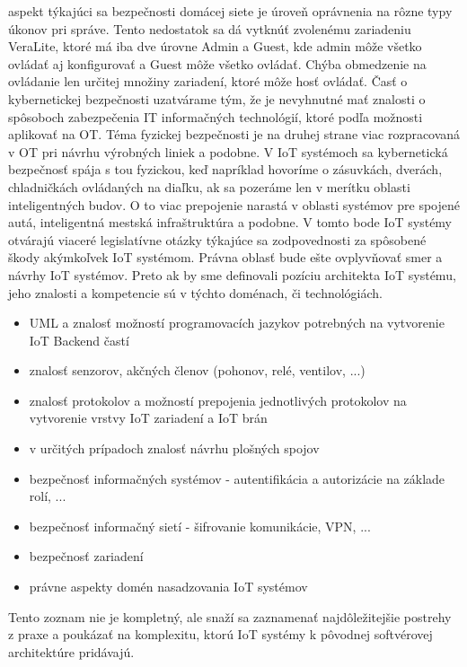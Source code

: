 aspekt týkajúci sa bezpečnosti domácej siete je úroveň oprávnenia na rôzne typy úkonov pri správe. Tento nedostatok sa dá vytknúť zvolenému zariadeniu VeraLite, ktoré má iba dve úrovne Admin a Guest, kde admin môže všetko ovládať aj konfigurovať a Guest môže všetko ovládať. Chýba obmedzenie na ovládanie len určitej množiny zariadení, ktoré môže hosť ovládať. Časť o kybernetickej bezpečnosti uzatvárame tým, že je nevyhnutné mať znalosti o spôsoboch zabezpečenia IT informačných technológií, ktoré podľa možnosti aplikovať na OT. Téma fyzickej bezpečnosti je na druhej strane viac rozpracovaná v OT pri návrhu výrobných liniek a podobne. V IoT systémoch sa kybernetická bezpečnosť spája s tou fyzickou, keď napríklad hovoríme o zásuvkách, dverách, chladničkách ovládaných na diaľku, ak sa pozeráme len v merítku oblasti inteligentných budov. O to viac prepojenie narastá v oblasti systémov pre spojené autá, inteligentná mestská infraštruktúra a podobne. V tomto bode IoT systémy otvárajú viaceré legislatívne otázky týkajúce sa zodpovednosti za spôsobené škody akýmkoľvek IoT systémom. Právna oblasť bude ešte ovplyvňovať smer a návrhy IoT systémov.   
Preto ak by sme definovali pozíciu architekta IoT systému, jeho znalosti a kompetencie sú v týchto doménach, či technológiách.
\begin{itemize}
\item UML a znalosť možností programovacích jazykov potrebných na vytvorenie IoT Backend častí
\item znalosť senzorov, akčných členov (pohonov, relé, ventilov, ...)
\item znalosť protokolov a možností prepojenia jednotlivých protokolov na vytvorenie vrstvy IoT zariadení a IoT brán
\item v určitých prípadoch znalosť návrhu plošných spojov
\item bezpečnosť informačných systémov - autentifikácia a autorizácie na základe rolí, ...
\item bezpečnosť informačný sietí - šifrovanie komunikácie, VPN, ...
\item bezpečnosť zariadení
\item právne aspekty domén nasadzovania IoT systémov
\end{itemize}
Tento zoznam nie je kompletný, ale snaží sa zaznamenať najdôležitejšie postrehy z praxe a poukázať na komplexitu, ktorú IoT systémy k pôvodnej softvérovej architektúre pridávajú.
